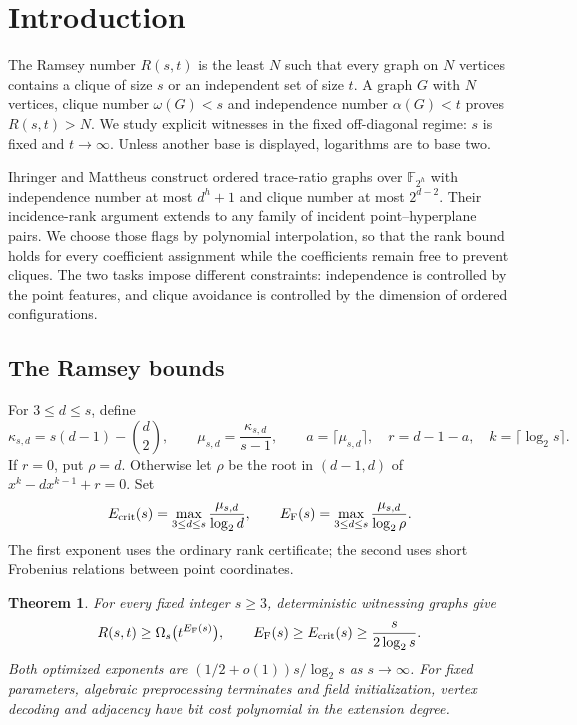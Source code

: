\documentclass[11pt,a4paper]{article}
\newcommand{\F}{\mathbb F}
\newtheorem{theorem}{Theorem}[section]
\theoremstyle{definition}
\theoremstyle{remark}
\numberwithin{equation}{section}
\begin{document}
\section{Introduction}\label{sec:intro}
The Ramsey number $R(s,t)$ is the least $N$ such that every graph on $N$ vertices contains a clique of size $s$ or an independent set of size $t$. A graph $G$ with $N$ vertices, clique number $\omega(G)<s$ and independence number $\alpha(G)<t$ proves $R(s,t)>N$. We study explicit witnesses in the fixed off-diagonal regime: $s$ is fixed and $t\to\infty$. Unless another base is displayed, logarithms are to base two.

Ihringer and Mattheus \cite{IM} construct ordered trace-ratio graphs over $\F_{2^h}$ with independence number at most $d^h+1$ and clique number at most $2^{d-2}$. Their incidence-rank argument extends to any family of incident point--hyperplane pairs. We choose those flags by polynomial interpolation, so that the rank bound holds for every coefficient assignment while the coefficients remain free to prevent cliques. The two tasks impose different constraints: independence is controlled by the point features, and clique avoidance is controlled by the dimension of ordered configurations.

\subsection{The Ramsey bounds}
For $3\le d\le s$, define
\[
\kappa_{s,d}=s(d-1)-\binom d2,\qquad
\mu_{s,d}=\frac{\kappa_{s,d}}{s-1},\qquad
a=\lceil\mu_{s,d}\rceil,\quad r=d-1-a,\quad k=\lceil\log_2s\rceil.
\]
If $r=0$, put $\rho=d$. Otherwise let $\rho$ be the root in $(d-1,d)$ of $x^k-dx^{k-1}+r=0$. Set
\[
E_{\rm crit}(s)=\max_{3\le d\le s}\frac{\mu_{s,d}}{\log_2d},\qquad
E_{\rm F}(s)=\max_{3\le d\le s}\frac{\mu_{s,d}}{\log_2\rho}.
\]
The first exponent uses the ordinary rank certificate; the second uses short Frobenius relations between point coordinates.

\begin{theorem}\label{thm:main}
For every fixed integer $s\ge3$, deterministic witnessing graphs give
\[
R(s,t)\ge\Omega_s\bigl(t^{E_{\rm F}(s)}\bigr),\qquad
E_{\rm F}(s)\ge E_{\rm crit}(s)\ge\frac{s}{2\log_2s}.
\]
Both optimized exponents are $(1/2+o(1))s/\log_2s$ as $s\to\infty$. For fixed parameters, algebraic preprocessing terminates and field initialization, vertex decoding and adjacency have bit cost polynomial in the extension degree.
\end{theorem}
\end{document}
